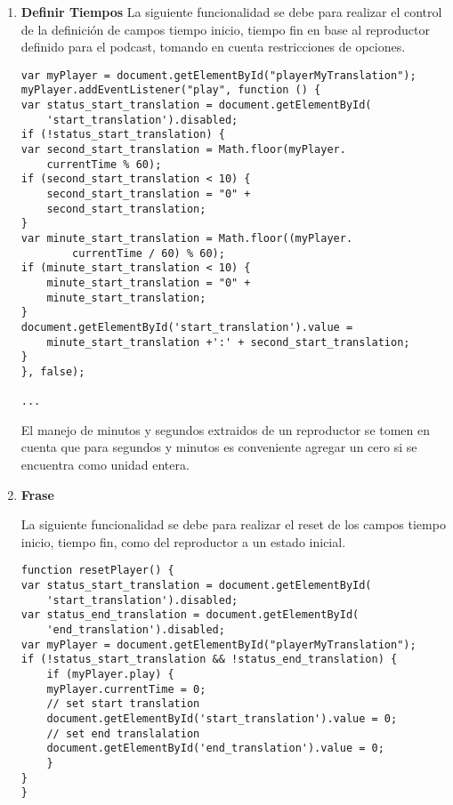 \begin{enumerate}
\item \textbf{Definir Tiempos}
La siguiente funcionalidad se debe para realizar el control de la definici\'{o}n
de campos tiempo inicio, tiempo fin en base al reproductor definido para el podcast,
tomando en cuenta restricciones de opciones.
\begin{lstlisting}[]
var myPlayer = document.getElementById("playerMyTranslation");
myPlayer.addEventListener("play", function () {
var status_start_translation = document.getElementById(
    'start_translation').disabled;
if (!status_start_translation) {
var second_start_translation = Math.floor(myPlayer.
    currentTime % 60);
if (second_start_translation < 10) {
    second_start_translation = "0" + 
    second_start_translation;
}
var minute_start_translation = Math.floor((myPlayer.
        currentTime / 60) % 60);
if (minute_start_translation < 10) {
    minute_start_translation = "0" + 
    minute_start_translation;
}
document.getElementById('start_translation').value = 
    minute_start_translation +':' + second_start_translation;
}
}, false);

...
\end{lstlisting}

El manejo de minutos y segundos extraidos de un reproductor se tomen en cuenta
que para segundos y minutos es conveniente agregar un cero si se encuentra como
unidad entera.

\item \textbf{Frase}

La siguiente funcionalidad se debe para realizar el reset de los campos tiempo
inicio, tiempo fin, como del reproductor a un estado inicial.

\begin{lstlisting}[]
function resetPlayer() {
var status_start_translation = document.getElementById(
    'start_translation').disabled;
var status_end_translation = document.getElementById(
    'end_translation').disabled;
var myPlayer = document.getElementById("playerMyTranslation");
if (!status_start_translation && !status_end_translation) {
    if (myPlayer.play) {
    myPlayer.currentTime = 0;
    // set start translation
    document.getElementById('start_translation').value = 0;
    // set end translalation
    document.getElementById('end_translation').value = 0;
    }
}
}
\end{lstlisting}

\end{enumerate}

